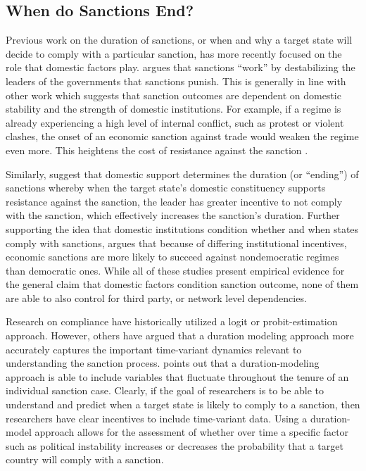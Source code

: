 \subsection*{When do Sanctions End?}
\label{lit}

Previous work on the duration of sanctions, or when and why a target state will decide to comply with a particular sanction, has more recently focused on the role that domestic factors play. \cite{marinov2005} argues that sanctions ``work'' by destabilizing the leaders of the governments that sanctions punish. This is generally in line with other work which suggests that sanction outcomes are dependent on domestic stability and the strength of domestic institutions. For example, if a regime is already experiencing a high level of internal conflict, such as protest or violent clashes, the onset of an economic sanction against trade would weaken the regime even more. This heightens the cost of resistance against the sanction \citep{dashti1997}. 

Similarly, \citep{dorussen2001} suggest that domestic support determines the duration (or ``ending'') of sanctions whereby when the target state's domestic constituency supports resistance against the sanction, the leader has greater incentive to not comply with the sanction, which effectively increases the sanction's duration. Further supporting the idea that domestic institutions condition whether and when states comply with sanctions, \cite{lektzian2007} argues that because of differing institutional incentives, economic sanctions are more likely to succeed against nondemocratic regimes than democratic ones. While all of these studies present empirical evidence for the general claim that domestic factors condition sanction outcome, none of them are able to also control for third party, or network level dependencies. 


Research on compliance have historically utilized a logit or probit-estimation approach. However, others have argued that a duration modeling approach more accurately captures the important time-variant dynamics relevant to understanding the sanction process. \cite{bolks2000} points out that a duration-modeling approach is able to include variables that fluctuate throughout the tenure of an individual sanction case. Clearly, if the goal of researchers is to be able to understand and predict when a target state is likely to comply to a sanction, then researchers have clear incentives to include time-variant data. Using a duration-model approach allows for the assessment of whether over time a specific factor such as political instability increases or decreases the probability that a target country will comply with a sanction.

